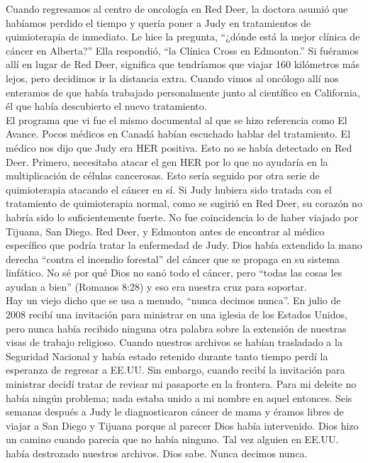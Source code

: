 \documentclass[twoside, 12pt]{book}
\begin{document}
Cuando regresamos al centro de oncología en Red Deer, la doctora asumió que habíamos perdido el tiempo y quería poner a Judy en tratamientos de quimioterapia de inmediato. Le hice la pregunta, “¿dónde está la mejor clínica de cáncer en Alberta?” Ella respondió, “la Clínica Cross en Edmonton.” Si fuéramos allí en lugar de Red Deer, significa que tendríamos que viajar 160 kilómetros más lejos, pero decidimos ir la distancia extra. Cuando vimos al oncólogo allí nos enteramos de que había trabajado personalmente junto al científico en California, él que había descubierto el nuevo tratamiento.\\

El programa que vi fue el mismo documental al que se hizo referencia como El Avance. Pocos médicos en Canadá habían escuchado hablar del tratamiento. El médico nos dijo que Judy era HER positiva. Esto no se había detectado en Red Deer. Primero, necesitaba atacar el gen HER por lo que no ayudaría en la multiplicación de células cancerosas. Esto sería seguido por otra serie de quimioterapia atacando el cáncer en sí. Si Judy hubiera sido tratada con el tratamiento de quimioterapia normal, como se sugirió en Red Deer, su corazón no habría sido lo suficientemente fuerte. No fue coincidencia lo de haber viajado por Tijuana, San Diego. Red Deer, y Edmonton antes de encontrar al médico específico que podría tratar la enfermedad de Judy. Dios había extendido la mano derecha “contra el incendio forestal” del cáncer que se propaga en su sistema linfático.  No sé por qué Dios no sanó todo el cáncer, pero “todas las cosas les ayudan a bien” (Romanos 8:28) y eso era nuestra cruz para soportar.\\

Hay un viejo dicho que se usa a menudo, “nunca decimos nunca”. En julio de 2008 recibí una invitación para ministrar en una iglesia de los Estados Unidos, pero nunca había recibido ninguna otra palabra sobre la extensión de nuestras visas de trabajo religioso. Cuando nuestros archivos se habían trasladado a la Seguridad Nacional y había estado retenido durante tanto tiempo perdí la esperanza de regresar a EE.UU. Sin embargo, cuando recibí la invitación para ministrar decidí tratar de revisar mi pasaporte en la frontera. Para mi deleite no había ningún problema; nada estaba unido a mi nombre en aquel entonces. Seis semanas después a Judy le diagnosticaron cáncer de mama y éramos libres de viajar a San Diego y Tijuana porque al parecer Dios había intervenido. Dios hizo un camino cuando parecía que no había ninguno.  Tal vez alguien en EE.UU. había destrozado nuestros archivos.  Dios sabe.  Nunca decimos nunca.\\
\end{document}
